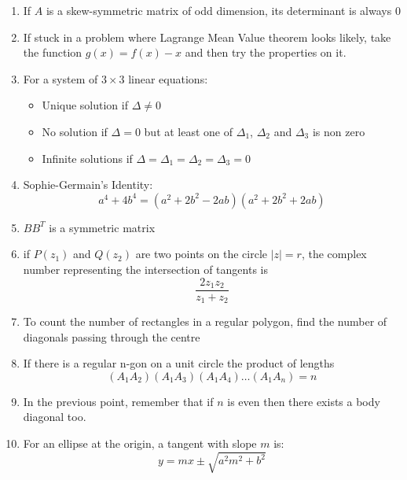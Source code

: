 \documentclass{article}
\numberwithin{equation}{section}
\numberwithin{figure}{section}
\newcommand{\Cr}{\times}
\begin{document}
\begin{enumerate}
\begin{itemize}
			\end{itemize}
		\item   If $A$ is a skew-symmetric matrix of odd dimension, its determinant is always $0$ 
		\item If stuck in a problem where Lagrange Mean Value theorem looks likely, take the function $g(x)=f(x)-x$ and then try the properties on it.
		\item For a system of $3\Cr3$ linear equations:
			\begin{itemize}
				\item Unique solution if $\Delta\neq 0$
				\item No solution if $\Delta = 0$ but at least one of $\Delta_1$, $\Delta_2$ and $\Delta_3$ is non zero
				\item Infinite solutions if $\Delta=\Delta_1=\Delta_2=\Delta_3=0$
			\end{itemize}
		\item Sophie-Germain's Identity:
			\begin{equation}
				a^{4} + 4b^{4} = (a^{2}+2b^{2}-2ab)(a^{2}+2b^{2}+2ab)
			\end{equation}
		\item $BB^{T}$ is a symmetric matrix
		\item if $P(z_1)$ and $Q(z_2)$ are two points on the circle $|z|=r$, the complex number representing the intersection of tangents is $$\frac{2 z_1 z_2}{z_1+z_2}$$
		\item To count the number of rectangles in a regular polygon, find the number of diagonals passing through the centre
		\item If there is a regular n-gon on a unit circle the product of lengths $$(A_1 A_2)(A_1 A_3)(A_1 A_4)\dots (A_1 A_n)=n$$
		\item In the previous point, remember that if $n$ is even then there exists a body diagonal too. 
		\item For an ellipse at the origin, a tangent with slope $m$ is:
			\begin{equation}
				y=mx \pm \sqrt{a^2 m^2 + b^2}
			\end{equation}


\end{enumerate}
\end{document}

